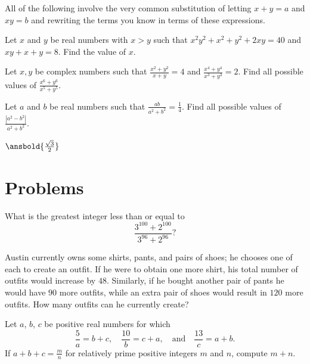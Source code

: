 \documentclass{article}
\begin{document}
All of the following involve the very common substitution of letting $x+y=a$ and $xy=b$ and rewriting the terms you know in terms of these expressions.
\begin{exam}
Let $x$ and $y$ be real numbers with $x > y$ such that $x^2 y^2 + x^2 + y^2 + 2xy = 40$ and $xy + x + y = 8$. Find
the value of $x$.
\end{exam}

\begin{exam}
Let $x,y$ be complex numbers such that $\frac{x^2+y^2}{x+y} = 4$ and $\frac{x^4+y^4}{x^3+y^3} = 2$. Find all possible values of 
$\frac{x^6+y^6}{x^5+y^5}$.
\end{exam}

\begin{exam}
Let $a$ and $b$ be real numbers such that $\frac{ab}{a^2+b^2}=\frac{1}{4}$. Find all possible values of $\frac{|a^2-b^2|}{a^2+b^2}$.
\end{exam}

\begin{sol}
$\ansbold{\frac{\sqrt{3}}{2}}$
\end{sol}


\pagebreak\section{Problems}

\minpt{}


\begin{prob}[AMC 10A 2018/14]{2}
What is the greatest integer less than or equal to\[\frac{3^{100}+2^{100}}{3^{96}+2^{96}}?\]
\end{prob}

\begin{prob}[2008-2009 Mandelbrot]{3}
Austin currently owns some shirts, pants, and pairs of shoes; he chooses one of each to create an outfit. If he were to obtain one more shirt, his total number of outfits would increase by $48.$ Similarly, if he bought another pair of pants he would have $90$ more outfits, while an extra pair of shoes would result in $120$ more outfits. How many outfits can he currently create?
\end{prob}
  

\begin{prob}{4}
Let $a$, $b$, $c$ be positive real numbers for which
\[
  \frac{5}{a} = b+c, \quad
  \frac{10}{b} = c+a, \quad \text{and} \quad
  \frac{13}{c} = a+b.
\]
If $a+b+c = \frac mn$ for relatively prime positive integers $m$ and $n$, compute $m+n$.
\end{prob}
  
\end{document}
